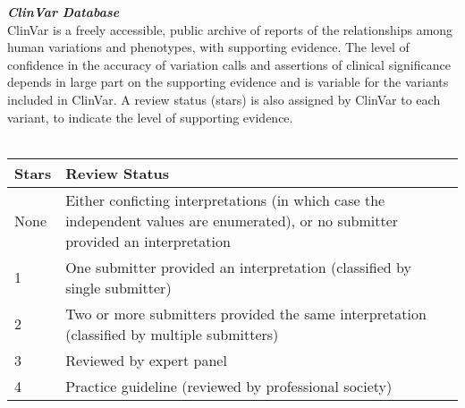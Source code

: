 \newpage
{\large \textbf{\textit{ClinVar Database}}}
\\
ClinVar is a freely accessible, public archive of reports of the relationships among human variations and phenotypes, with supporting evidence. The level of confidence in the accuracy of variation calls and assertions of clinical significance depends in large part on the supporting evidence and is variable for the variants included in ClinVar. A review status (stars) is also assigned by ClinVar to each variant, to indicate the level of supporting evidence. 
\\ \\

\begin{small}
\begin{tabular}{ |p{1cm}|p{15cm}|  }
\hline
\textbf{Stars} & \textbf{Review Status} \\
\hline
None & Either conficting interpretations (in which case the independent values are enumerated), or no submitter provided an interpretation \\
1 & One submitter provided an interpretation (classified by single submitter) \\
2 & Two or more submitters provided the same interpretation (classified by multiple submitters) \\
3 & Reviewed by expert panel \\
4 & Practice guideline (reviewed by professional society) \\
\hline
\end{tabular}
\end{small}
\\ \\

